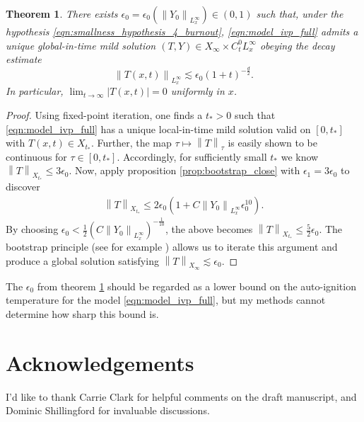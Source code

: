 \documentclass[twosided, 12pt]{article}
\numberwithin{equation}{section}
\theoremstyle{plain}
\newtheorem{thm}{Theorem}[section]
\newcommand{\eps}{\epsilon}
\begin{document}
\begin{thm}\label{thm:decay_for_lambda=0_nonradiating}
    There exists $\eps_0 =\eps_0\left(\left\|Y_0\right\|_{L^\infty_x}\right)\in (0,1)$ such that, under the hypothesis \eqref{eqn:smallness_hypothesis_4_burnout}, \eqref{eqn:model_ivp_full} admits a unique global-in-time mild solution $\left(T,Y\right)\in X_{\infty}\times C^0_t L^{\infty}_x$ obeying the decay estimate
    \begin{equation}
        \left\|T(x,t)\right\|_{L^{\infty}_{x}} \lesssim \eps_0 \left(1+t\right)^{-\frac{d}{2}}. 
    \end{equation}
    In particular, $\lim_{t\rightarrow \infty}|T(x,t)| = 0$ uniformly in $x$. 
\end{thm}
\begin{proof}
    Using fixed-point iteration, one finds a $t_{*}>0$ such that \eqref{eqn:model_ivp_full} has a unique local-in-time mild solution valid on $[0,t_*]$ with $T(x,t)\in X_{t_{*}}$. Further, the map $\tau\mapsto \left\|T\right\|_{\tau}$ is easily shown to be continuous for $\tau\in [0,t_*]$. Accordingly, for sufficiently small $t_{*}$ we know $\left\|T\right\|_{X_{t_{*}}}\leq 3\eps_0$. Now, apply proposition \ref{prop:bootstrap_close} with $\eps_1 = 3\eps_0$ to discover 
    \begin{align*}
        \left\|T\right\|_{X_{t_{*}}} \leq 2\eps_0 \left(1 + C \left\|Y_0\right\|_{L^\infty_x} \eps_0^{10}\right). 
    \end{align*}
    By choosing $\eps_0 < \frac12\left(C\left\|Y_0\right\|_{L^\infty_x}\right)^{-\frac{1}{10}}$, the above becomes $\left\|T\right\|_{X_{t_{*}}}\leq \frac52\eps_0$. The bootstrap principle (see for example \cite{Tao2006}) allows us to iterate this argument and produce a global solution satisfying $\left\|T\right\|_{X_{\infty}}\lesssim \eps_0$. 
\end{proof}
\noindent 
The $\eps_0$ from theorem \ref{thm:decay_for_lambda=0_nonradiating} should be regarded as a lower bound on the auto-ignition temperature for the model \eqref{eqn:model_ivp_full}, but my methods cannot determine how sharp this bound is. 

\section{Acknowledgements}
I'd like to thank Carrie Clark for helpful comments on the draft manuscript, and Dominic Shillingford for invaluable discussions. 



\end{document}
